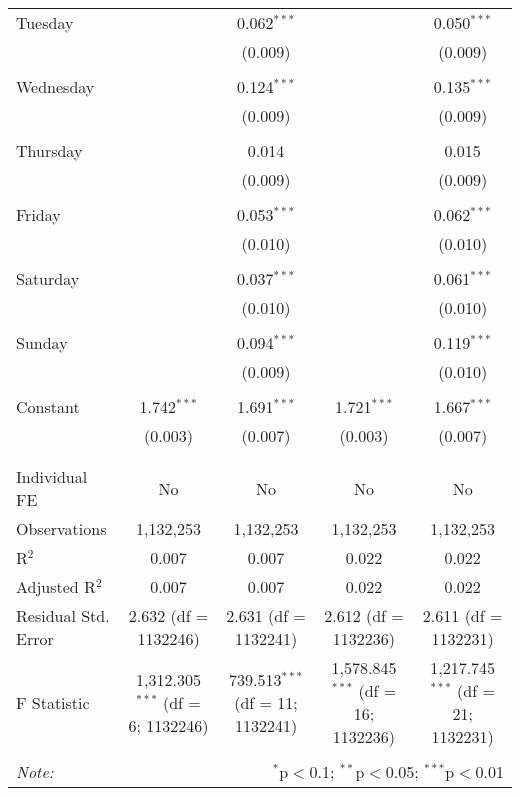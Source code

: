 \documentclass[
]{article}
\begin{document}
\begin{table}[!htbp]
{\begin{tabular}{@{\extracolsep{5pt}}lcccc}
 Tuesday &  & 0.062$^{***}$ &  & 0.050$^{***}$ \\ 
  &  & (0.009) &  & (0.009) \\ 
  & & & & \\ 
 Wednesday &  & 0.124$^{***}$ &  & 0.135$^{***}$ \\ 
  &  & (0.009) &  & (0.009) \\ 
  & & & & \\ 
 Thursday &  & 0.014 &  & 0.015 \\ 
  &  & (0.009) &  & (0.009) \\ 
  & & & & \\ 
 Friday &  & 0.053$^{***}$ &  & 0.062$^{***}$ \\ 
  &  & (0.010) &  & (0.010) \\ 
  & & & & \\ 
 Saturday &  & 0.037$^{***}$ &  & 0.061$^{***}$ \\ 
  &  & (0.010) &  & (0.010) \\ 
  & & & & \\ 
 Sunday &  & 0.094$^{***}$ &  & 0.119$^{***}$ \\ 
  &  & (0.009) &  & (0.010) \\ 
  & & & & \\ 
 Constant & 1.742$^{***}$ & 1.691$^{***}$ & 1.721$^{***}$ & 1.667$^{***}$ \\ 
  & (0.003) & (0.007) & (0.003) & (0.007) \\ 
  & & & & \\ 
\hline \\[-1.8ex] 
Individual FE & No & No & No & No \\ 
Observations & 1,132,253 & 1,132,253 & 1,132,253 & 1,132,253 \\ 
R$^{2}$ & 0.007 & 0.007 & 0.022 & 0.022 \\ 
Adjusted R$^{2}$ & 0.007 & 0.007 & 0.022 & 0.022 \\ 
Residual Std. Error & 2.632 (df = 1132246) & 2.631 (df = 1132241) & 2.612 (df = 1132236) & 2.611 (df = 1132231) \\ 
F Statistic & 1,312.305$^{***}$ (df = 6; 1132246) & 739.513$^{***}$ (df = 11; 1132241) & 1,578.845$^{***}$ (df = 16; 1132236) & 1,217.745$^{***}$ (df = 21; 1132231) \\ 
\hline 
\hline \\[-1.8ex] 
\textit{Note:}  & \multicolumn{4}{r}{$^{*}$p$<$0.1; $^{**}$p$<$0.05; $^{***}$p$<$0.01} \\ 
\end{tabular}
} 
\end{table} 
\newpage
\end{document}
